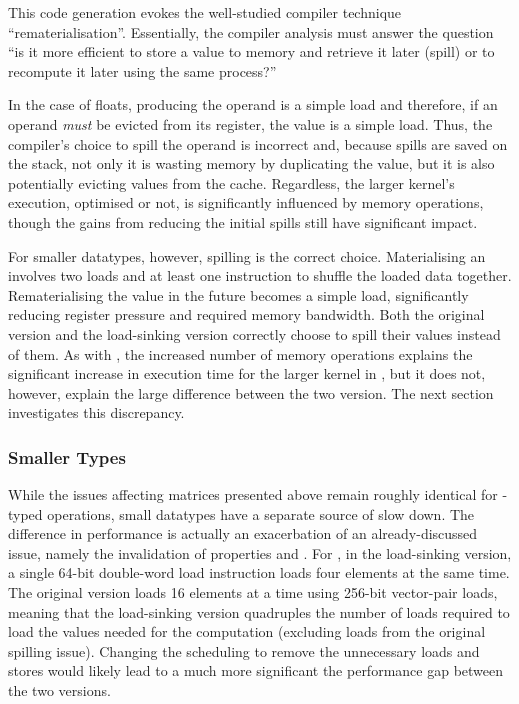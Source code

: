 \documentclass[\main/thesis.tex]{subfiles}
\begin{document}
This code generation evokes the well-studied compiler technique ``\gls{rematerialisation}''.
Essentially, the compiler analysis must answer the question ``is it more efficient to store a value to memory and retrieve it later (\gls{spill}) or to recompute it later using the same process?''

In the case of floats, producing the operand is a simple load and therefore, if an operand \emph{must} be evicted from its register,  the value is a simple load.
Thus, the compiler's choice to spill the operand is incorrect and, because spills are saved on the stack, not only it is wasting memory by duplicating the value, but it is also potentially evicting values from the cache.
Regardless, the larger kernel's execution, optimised or not, is significantly influenced by memory operations, though the gains from reducing the initial spills still have significant impact.

For smaller datatypes, however, spilling is the correct choice.
Materialising an  involves two loads and at least one instruction to shuffle the loaded data together.
Rematerialising the value in the future becomes a simple load, significantly reducing register pressure and required memory bandwidth.
Both the original version and the load-sinking version correctly choose to spill their values instead of  them.
As with , the increased number of memory operations explains the significant increase in execution time for the larger  kernel in , but it does not, however, explain the large difference between the two version.
The next section investigates this discrepancy.

\subsubsection{Smaller Types}
While the issues affecting  matrices presented above remain roughly identical for -typed operations, small datatypes have a separate source of slow down.
The difference in performance is actually an exacerbation of an already-discussed issue, namely the invalidation of properties  and .
For , in the load-sinking version, a single 64-bit double-word load instruction loads four  elements at the same time.
The original version loads 16 elements at a time using 256-bit vector-pair loads, meaning that the load-sinking version quadruples the number of loads required to load the values needed for the computation (excluding loads from the original spilling issue).
Changing the scheduling to remove the unnecessary loads and stores would likely lead to a much more significant the performance gap between the two versions.
\end{document}
